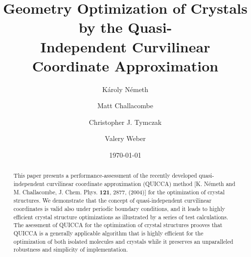 \documentclass[prl,aps,preprint,superbib,12pt]{revtex4}
\begin{document}
\title{Geometry Optimization of Crystals by the Quasi-\\
       Independent Curvilinear Coordinate Approximation}

\author{K\'aroly N\'emeth\footnotemark[1]}
\author{Matt Challacombe}
\author{Christopher J. Tymczak}
\author{Valery Weber}


\date{\today}

\begin{abstract}
This paper presents a performance-assessment 
of the recently developed quasi-independent curvilinear coordinate
approximation (QUICCA) method [K. N\'emeth and M. Challacombe,
J. Chem. Phys. {\bf 121}, 2877, (2004)] for the optimization of crystal 
structures. 
We demonstrate that the concept of quasi-independent
curvilinear coordinates is valid also under periodic boundary 
conditions,
and it leads to highly efficient crystal structure optimizations
as illustrated by a series of test calculations. 
The asessment of QUICCA for the optimization of crystal structures
prooves that QUICCA is a generally applicable algorithm
that is highly efficient for the optimization of both isolated 
molecules and crystals while it preserves an unparalleled robustness 
and simplicity of implementation.
\end{abstract}


\maketitle

\end{document}
